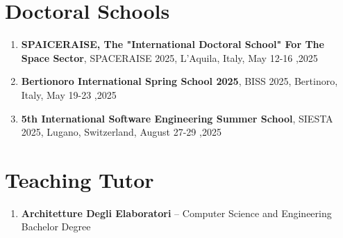 \documentclass[runningheads]{llncs}
\begin{document}

    \section{Doctoral Schools}\label{sec:doctoral-schools}
    \begin{enumerate}
        \item \textbf{SPAICERAISE, The "International Doctoral School" For The Space Sector}, SPACERAISE 2025, L'Aquila, Italy, May 12-16 ,2025
        \item \textbf{Bertionoro International Spring School 2025}, BISS 2025, Bertinoro, Italy, May 19-23 ,2025
        \item \textbf{5th International Software Engineering Summer School}, SIESTA 2025, Lugano, Switzerland, August 27-29 ,2025
    \end{enumerate}

    \section{Teaching Tutor}
    \begin{enumerate}
        \item \textbf{Architetture Degli Elaboratori} -- Computer Science and Engineering Bachelor Degree
    \end{enumerate}
\end{document}
